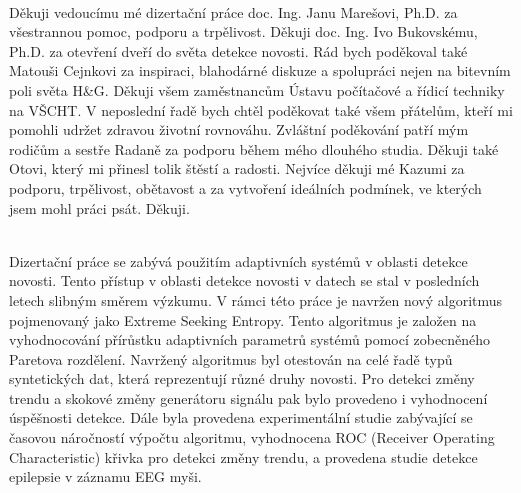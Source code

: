  \vspace*{\fill}
  \\ [5mm]
Děkuji vedoucímu mé dizertační práce doc. Ing. Janu Marešovi, Ph.D. za všestrannou pomoc, podporu a trpělivost. Děkuji doc. Ing. Ivo Bukovskému, Ph.D.  za otevření dveří do světa detekce novosti. Rád bych poděkoval také Matouši Cejnkovi za inspiraci, blahodárné diskuze a spolupráci nejen na bitevním poli světa H\&G. Děkuji všem zaměstnancům Ústavu počítačové a řídicí techniky na VŠCHT. V neposlední řadě bych chtěl poděkovat také všem přátelům, kteří mi pomohli udržet zdravou životní rovnováhu. Zvláštní poděkování patří  mým rodičům a sestře Radaně za podporu během mého dlouhého studia. Děkuji také Otovi, který mi přinesl tolik štěstí a radosti. Nejvíce děkuji mé Kazumi za podporu, trpělivost, obětavost a za vytvoření ideálních podmínek, ve kterých jsem mohl práci psát. Děkuji.

 





\cleardoublepage
\thispagestyle{empty}

 \\ [5mm]
Dizertační práce se zabývá použitím adaptivních systémů v oblasti detekce novosti. Tento přístup v oblasti detekce novosti v datech se stal v posledních letech slibným směrem výzkumu. V rámci této práce je navržen nový algoritmus pojmenovaný jako Extreme Seeking Entropy. Tento algoritmus je založen na vyhodnocování přírůstku adaptivních parametrů systémů pomocí zobecněného Paretova rozdělení. Navržený algoritmus byl otestován na celé řadě typů syntetických dat, která reprezentují různé druhy novosti. Pro detekci změny trendu a skokové změny generátoru signálu pak bylo provedeno i vyhodnocení úspěšnosti detekce. Dále byla provedena experimentální studie zabývající se časovou náročností výpočtu algoritmu, vyhodnocena ROC (Receiver Operating Characteristic) křivka pro detekci změny trendu, a provedena studie detekce epilepsie v záznamu EEG myši.\\ [5mm]
  \\ [5mm] 


\cleardoublepage
\thispagestyle{empty}


